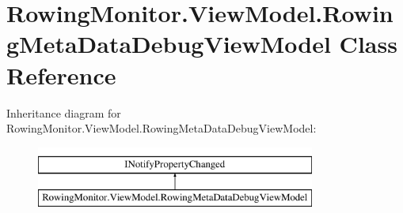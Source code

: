 \hypertarget{class_rowing_monitor_1_1_view_model_1_1_rowing_meta_data_debug_view_model}{}\section{Rowing\+Monitor.\+View\+Model.\+Rowing\+Meta\+Data\+Debug\+View\+Model Class Reference}
\label{class_rowing_monitor_1_1_view_model_1_1_rowing_meta_data_debug_view_model}
Inheritance diagram for Rowing\+Monitor.\+View\+Model.\+Rowing\+Meta\+Data\+Debug\+View\+Model\+:\begin{figure}[H]
\begin{center}
\leavevmode
\includegraphics[height=2.000000cm]{class_rowing_monitor_1_1_view_model_1_1_rowing_meta_data_debug_view_model}
\end{center}
\end{figure}
